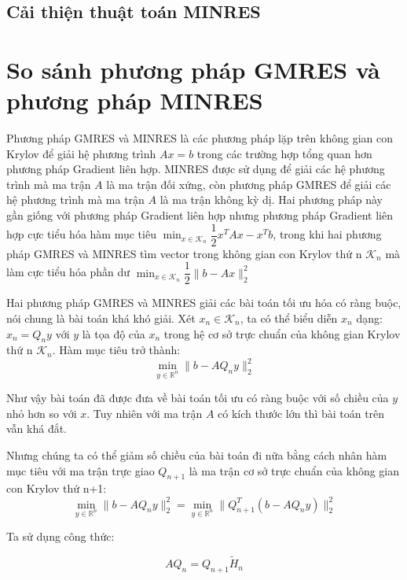 \documentclass[14pt, a4paper]{article}
\numberwithin{equation}{section}
\numberwithin{algorithm}{section}
\numberwithin{figure}{section}
\numberwithin{dl}{section}
\numberwithin{md}{section}
\numberwithin{bd}{section}
\numberwithin{dn}{section}
\begin{document}
\subsection{Cải thiện thuật toán MINRES}

\section{So sánh phương pháp GMRES và phương pháp MINRES}

Phương pháp GMRES và MINRES là các phương pháp lặp trên không gian con Krylov để giải hệ phương trình $Ax=b$ trong các trường hợp tổng quan hơn phương pháp Gradient liên hợp.
MINRES được sử dụng để giải các hệ phương trình mà ma trận $A$ là ma trận đối xứng, còn phương pháp GMRES để giải các hệ phương trình mà ma trận $A$ là ma trận không kỳ dị.
Hai phương pháp này gần giống với phương pháp Gradient liên hợp nhưng phương pháp Gradient liên hợp cực tiểu hóa hàm mục tiêu $\displaystyle \min_{x \in \mathcal{K}_n}\dfrac{1}{2}x^TAx - x^Tb$,
trong khi hai phương pháp GMRES và MINRES tìm vector trong không gian con Krylov thứ n $\displaystyle \mathcal{K}_n$ mà làm cực tiểu hóa phần dư $\displaystyle \min_{x \in \mathcal{K}_n}\dfrac{1}{2}\lVert b - Ax \rVert_2^2$

Hai phương pháp GMRES và MINRES giải các bài toán tối ưu hóa có ràng buộc, nói chung là bài toán khá khó giải. Xét $x_n \in \mathcal{K}_n$, ta có thể biểu diễn $x_n$ dạng:
$x_n = Q_n y$ với $y$ là tọa độ của $x_n$ trong hệ cơ sở trực chuẩn của không gian Krylov thứ n $\mathcal{K}_n$. Hàm mục tiêu trở thành:
\begin{equation} \min_{y \in \mathbb{R}^{n}}  \lVert b - AQ_n y \rVert_2^2\end{equation}

Như vậy bài toán đã được đưa về bài toán tối ưu có ràng buộc với số chiều của $y$ nhỏ hơn so với $x$. Tuy nhiên với ma trận $A$ có kích thước lớn thì bài toán trên vẫn khá đắt.

Nhưng chúng ta có thể giảm số chiều của bài toán đi nữa bằng cách nhân hàm mục tiêu với ma trận trực giao $Q_{n+1}$ là ma trận cơ sở trực chuẩn của không gian con Krylov thứ n+1:
\begin{equation} \min_{y \in \mathbb{R}^{n}}  \lVert b - AQ_n y \rVert_2^2 = \min_{y \in \mathbb{R}^{n}}  \lVert Q_{n+1}^T(b - AQ_n y) \rVert_2^2 \label{eq:uncons_obj}\end{equation}

Ta sử dụng công thức:

\begin{equation}
    AQ_n = Q_{n+1}\widetilde{H}_n
\end{equation}
\end{document}
